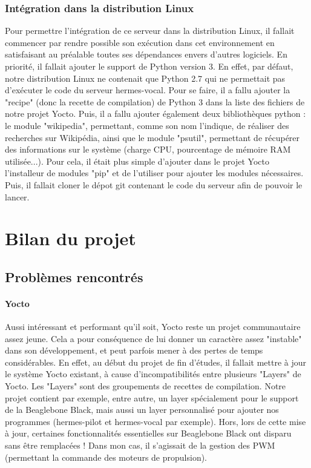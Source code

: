 \documentclass{report}
\begin{document}
\subsection{Intégration dans la distribution Linux}
{Pour permettre l'intégration de ce serveur dans la distribution Linux, il fallait
commencer par rendre possible son exécution dans cet environnement en satisfaisant
au préalable toutes ses dépendances envers d'autres logiciels. En priorité, il
fallait ajouter le support de Python version 3. En effet, par défaut, notre distribution
Linux ne contenait que Python 2.7 qui ne permettait pas d'exécuter le code du serveur
hermes-vocal. Pour se faire, il a fallu ajouter la "recipe" (donc la recette de
compilation) de Python 3 dans la liste des fichiers de notre projet Yocto. Puis, il
a fallu ajouter également deux bibliothèques python : le module "wikipedia", permettant,
comme son nom l'indique, de réaliser des recherches sur Wikipédia, ainsi que le module
"psutil", permettant de récupérer des informations sur le système (charge CPU, pourcentage
de mémoire RAM utilisée...). Pour cela, il était plus simple d'ajouter dans le projet
Yocto l'installeur de modules "pip" et de l'utiliser pour ajouter les modules nécessaires.
Puis, il fallait cloner le dépot git contenant le code du serveur afin de pouvoir
le lancer.}


\chapter{Bilan du projet}
\section{Problèmes rencontrés}
\subsubsection{Yocto}
{Aussi intéressant et performant qu'il soit, Yocto reste un projet communautaire assez
jeune. Cela a pour conséquence de lui donner un caractère assez "instable" dans son
développement, et peut parfois mener à des pertes de temps considérables. En effet,
au début du projet de fin d'études, il fallait mettre à jour le système Yocto existant, à cause
d'incompatibilités entre plusieurs "Layers" de Yocto. Les "Layers" sont des groupements
de recettes de compilation. Notre projet contient par exemple, entre autre, un layer spécialement
pour le support de la Beaglebone Black, mais aussi un layer personnalisé pour ajouter
nos programmes (hermes-pilot et hermes-vocal par exemple). Hors, lors de cette mise
à jour, certaines fonctionnalités essentielles sur Beaglebone Black ont disparu sans
être remplacées ! Dans mon cas, il s'agissait de la gestion des PWM (permettant la
commande des moteurs de propulsion). }
\end{document}
